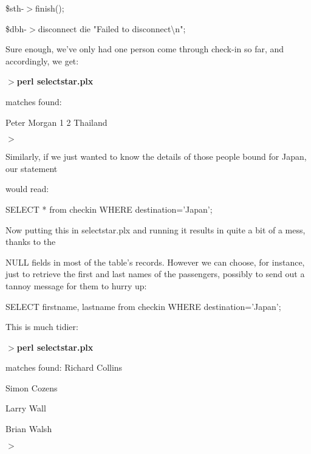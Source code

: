 \documentclass[a4paper,11pt]{book}
\begin{document}
\noindent 

\noindent \$sth-$>$finish();

\noindent 

\noindent \$dbh-$>$disconnect \textbar \textbar  die "Failed to disconnect\textbackslash n";

\noindent 

\noindent Sure enough,  we've only  had  one  person  come  through  check-in  so  far,  and  accordingly,  we get:

\noindent 

\noindent $>$\textbf{perl selectstar.plx}

 matches found:

 Peter Morgan 1 2 Thailand

\noindent $>$

\noindent 

\noindent Similarly,  if we just wanted to  know  the  details  of  those  people  bound  for Japan,  our statement

\noindent would read:

\noindent 

\noindent 

\noindent SELECT * from checkin WHERE destination='Japan';

\noindent 

\noindent Now  putting  this  in  selectstar.plx and  running it results in quite a bit of a mess, thanks to the

\noindent NULL fields in most of the table's records. However we can choose, for instance, just to retrieve the first and last names of the passengers, possibly to send out a tannoy message for them to hurry up:

\noindent 

\noindent 

\noindent SELECT firstname, lastname from checkin WHERE destination='Japan';

\noindent 

\noindent This is much tidier:

\noindent 

\noindent $>$\textbf{perl selectstar.plx}

 matches found: Richard Collins

\noindent Simon Cozens

\noindent Larry Wall

\noindent Brian Walsh

\noindent $>$

\noindent 
\end{document}
